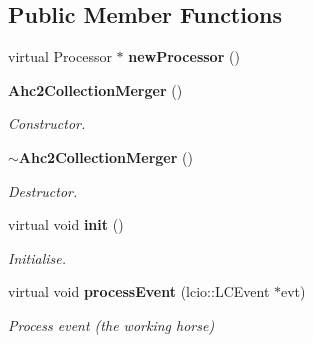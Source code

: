 \subsection*{Public Member Functions}
\begin{DoxyCompactItemize}
\item 
virtual Processor $\ast$ {\bfseries new\-Processor} ()\label{classCALICE_1_1Ahc2CollectionMerger_aadaac89942c47bef56cb419e5b54faf2}

\item 
{\bf Ahc2\-Collection\-Merger} ()\label{classCALICE_1_1Ahc2CollectionMerger_ac9e200f03523dd0822b91ca9b1d3843b}

\begin{DoxyCompactList}\small\item\em Constructor. \end{DoxyCompactList}\item 
{\bf $\sim$\-Ahc2\-Collection\-Merger} ()\label{classCALICE_1_1Ahc2CollectionMerger_a632fafa0ad0ee8b40f144117e4cc4ab9}

\begin{DoxyCompactList}\small\item\em Destructor. \end{DoxyCompactList}\item 
virtual void {\bf init} ()\label{classCALICE_1_1Ahc2CollectionMerger_a60857818e89b706e239a68e839188384}

\begin{DoxyCompactList}\small\item\em Initialise. \end{DoxyCompactList}\item 
virtual void {\bf process\-Event} (lcio\-::\-L\-C\-Event $\ast$evt)\label{classCALICE_1_1Ahc2CollectionMerger_a825abffb2abb11a2cade1ecb0056ee09}

\begin{DoxyCompactList}\small\item\em Process event (the working horse) \end{DoxyCompactList}\end{DoxyCompactItemize}
